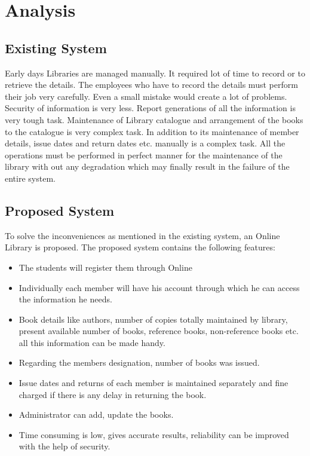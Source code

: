 \chapter{Analysis}

\section{Existing System}

Early days Libraries are managed manually. It required lot of time to record or to retrieve
the details. The employees who have to record the details must perform their job very
carefully. Even a small mistake would create a lot of problems. Security of information is
very less. Report generations of all the information is very tough task.
Maintenance of Library catalogue and arrangement of the books to the catalogue is very
complex task. In addition to its maintenance of member details, issue dates and return
dates etc. manually is a complex task.
All the operations must be performed in perfect manner for the maintenance of the library
with out any degradation which may finally result in the failure of the entire system.

\section{Proposed System}

To solve the inconveniences as mentioned in the existing system, an Online Library is
proposed. The proposed system contains the following features:
\begin{itemize}
\item The students will register them through Online
\item Individually each member will have his account through which he can access the
information he needs.
\item Book details like authors, number of copies totally maintained by library, present
available number of books, reference books, non-reference books etc. all this
information can be made handy.
\item Regarding the members designation, number of books was issued.
\item Issue dates and returns of each member is maintained separately and fine charged
if there is any delay in returning the book.
\item Administrator can add, update the books.
\item Time consuming is low, gives accurate results, reliability can be improved with
the help of security.
\end{itemize}


